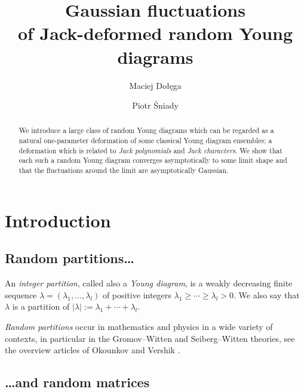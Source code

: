 \documentclass[12pt,usenames,dvipsnames,svgnames,table]{amsart}
\author{Maciej Dołęga}
\author{Piotr \'Sniady}
\title[Jack-deformed random Young diagrams]%
{Gaussian fluctuations \\ of Jack-deformed random Young diagrams}
\begin{document}
\begin{abstract}
We introduce a large class of random Young diagrams 
which can be regarded as a natural one-parameter deformation
of some classical Young diagram ensembles;
a deformation which is related to \emph{Jack polynomials} and \emph{Jack characters}. 
We show that each such a random Young diagram converges asymptotically to some limit shape
and that the fluctuations around the limit are asymptotically Gaussian. 
\end{abstract}



\maketitle

\section{Introduction}

\subsection{Random partitions\dots}
An \emph{integer partition}, called also a \emph{Young diagram}, 
is a weakly decreasing finite sequence $\lambda=(\lambda_1,\dots,\lambda_l)$ 
of positive integers $\lambda_1\geq \cdots \geq \lambda_l>0$.
We also say that $\lambda$ is a partition of $|\lambda|:=\lambda_1+\cdots+\lambda_l$.

\emph{Random partitions} 
occur in mathematics and physics in a wide variety of contexts,
in particular in the Gromov--Witten and Seiberg--Witten theories,
see the overview articles of Okounkov \cite{Okounkov2003} 
and Vershik \cite{VershikICM}. 

\subsection{\dots{}and random matrices}
\end{document}
